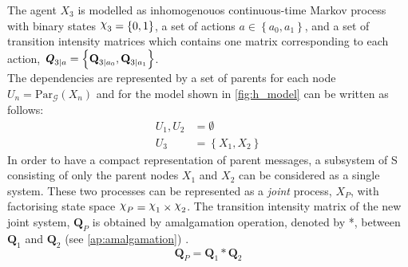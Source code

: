 The agent  $ X_{3} $ is modelled as inhomogenouos continuous-time Markov process with binary states $ \rchi_{3} = \left\lbrace 0, 1 \right\rbrace  $, a set of actions $ a \in \left\lbrace a_0, a_1\right\rbrace  $, and a set of transition intensity matrices which contains one matrix corresponding to each action, $ \textbf{\textit{Q}}_{3 \mid a} = \left\lbrace \textbf{Q}_{3\mid a_{0}}, \textbf{Q}_{3\mid a_{1}} \right\rbrace $.\\
The dependencies are represented by a set of parents for each node $ U_{n} = \mathrm{Par}_{\mathcal{G}}(X_n) $ and for the model shown in \cref{fig:h_model} can be written as follows:
\begin{align*}
U_{1}, U_{2} & = \emptyset \\
U_{3} & = \left\lbrace X_1, X_2 \right\rbrace 
\end{align*}
In order to have a compact representation of parent messages, a subsystem of S consisting of only the parent nodes $ X_1 $ and $ X_2 $ can be considered as a single system. These two processes can be represented as a \textit{joint} process, $ X_P $, with factorising state space $ \rchi_{P} = \rchi_1 \times \rchi_2  $. The transition intensity matrix of the new joint system, $ \textbf{Q}_P $ is obtained by amalgamation operation, denoted by *, between $ \textbf{Q}_{1} $ and  $ \textbf{Q}_{2} $ (see \cref{ap:amalgamation}) \cite{Nodelman1995}.
\begin{equation}
\textbf{Q}_P = \textbf{Q}_{1} * \textbf{Q}_{2}
\end{equation}

